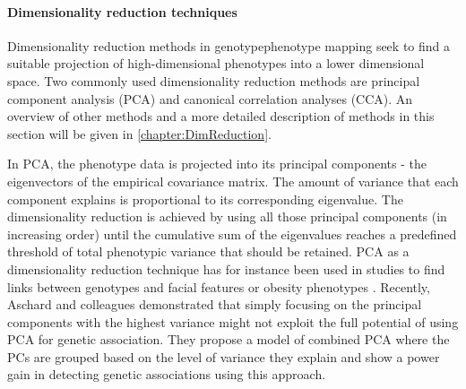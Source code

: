 \paragraph{Dimensionality reduction techniques} Dimensionality reduction methods in genotype\-phenotype mapping seek to find a suitable projection of high-dimensional phenotypes into a lower dimensional space. Two  commonly used dimensionality reduction methods are principal component analysis (PCA) and canonical correlation analyses (CCA). An overview of other methods and a more detailed description of methods in this section will be given in \cref{chapter:DimReduction}. 

In PCA, the phenotype data is projected into its principal components - the eigenvectors of the empirical covariance matrix. The amount of variance that each component explains is proportional to its corresponding eigenvalue. The dimensionality reduction is achieved by using all those principal components (in increasing order) until the cumulative sum of the eigenvalues reaches a predefined threshold of total phenotypic variance that should be retained. PCA as a dimensionality reduction technique has for instance been used in studies to find links between genotypes and facial features or obesity phenotypes \citep{Liu2012,Claes2014,He2008}. Recently, Aschard and colleagues \citep{Aschard2014} demonstrated that simply focusing on the principal components with the highest variance might not exploit the full potential of using PCA for genetic association. They propose a model of combined PCA where the PCs are grouped based on the level of variance they explain and show a power gain in detecting genetic associations using this approach.

